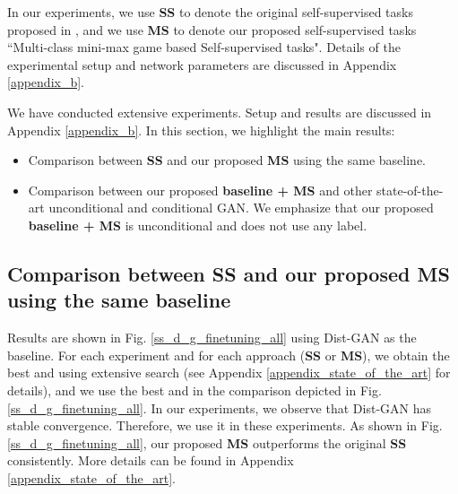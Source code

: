 \documentclass{article}
\begin{document}
In our experiments, we use
{\bf SS}
to denote the original self-supervised tasks proposed in \cite{chen-arxiv-2018},  and we use {\bf MS} to denote our proposed self-supervised tasks ``Multi-class mini-max game based Self-supervised tasks". Details of the experimental setup and network parameters are discussed in Appendix \ref{appendix_b}.

We have conducted extensive experiments. Setup and results are discussed in Appendix \ref{appendix_b}.
In this section, we highlight the main results:
\begin{itemize}
  \item Comparison between {\bf SS} and our proposed {\bf MS} using the same baseline.
  \item Comparison between our proposed {\bf baseline + MS} and other state-of-the-art unconditional and conditional GAN. We emphasize that our proposed {\bf baseline + MS} is unconditional and does not use any label.
\end{itemize}




\subsection{Comparison between {\bf SS} and our proposed {\bf MS} using the same baseline}
\label{compare_ss_ms}
Results are shown in 
Fig. \ref{ss_d_g_finetuning_all} using Dist-GAN \cite{tran-eccv-2018} as the baseline.
For each experiment and for each approach ({\bf SS} or {\bf MS}), 
we obtain the best  and  using extensive search (see Appendix \ref{appendix_state_of_the_art} for details), and we use the best  and  in the comparison depicted in Fig. \ref{ss_d_g_finetuning_all}. 
In our experiments, we observe that Dist-GAN has stable convergence. Therefore, we use it in these experiments. As shown in Fig. \ref{ss_d_g_finetuning_all}, our proposed {\bf MS} outperforms the original {\bf SS} consistently.
More details can be found in Appendix \ref{appendix_state_of_the_art}. 
\end{document}
